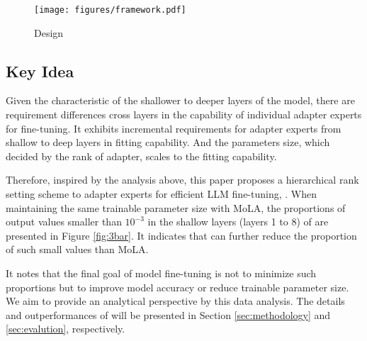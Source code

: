 \begin{figure*}
    \centering
    \texttt{[image: figures/framework.pdf]}
    \caption{\name Design}\label{fig:framework}
    \vspace{-5pt}
\end{figure*}

\subsection{Key Idea}\label{subsec:motivation}
Given the characteristic of the shallower to deeper layers of the model, there are requirement differences cross layers in the capability of individual adapter experts for fine-tuning. It exhibits incremental requirements for adapter experts from shallow to deep layers in fitting capability. And the parameters size, which decided by the rank of adapter, scales to the fitting capability. 

Therefore, inspired by the analysis above, this paper proposes a hierarchical rank setting scheme to adapter experts for efficient LLM fine-tuning, \name. When maintaining the same trainable parameter size with MoLA, the proportions of output values smaller than $10^{-3}$ in the shallow layers (layers 1 to 8) of \name are presented in Figure \ref{fig:3bar}. It indicates that \name can further reduce the proportion of such small values than MoLA. 

It notes that the final goal of model fine-tuning is not to minimize such proportions but to improve model accuracy or reduce trainable parameter size. We aim to provide an analytical perspective by this data analysis. The details and outperformances of \name will be presented in Section \ref{sec:methodology} and \ref{sec:evalution}, respectively.
